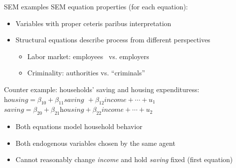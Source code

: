 \documentclass[usenames,dvipsnames]{beamer}
\begin{document}
\begin{frame}{SEM examples}
SEM equation properties (for each equation):\\
\smallskip
\begin{itemize}
\item Variables with proper ceteris paribus interpretation
\item Structural equations describe process from different perspectives\\
\begin{itemize}
    \item Labor market: employees \quad ~vs. \quad employers
    \item Criminality: \quad authorities \quad vs. \quad ``criminals''
\end{itemize}
\end{itemize} \bigskip
\small
Counter example: households' saving and housing expendituress:\\
\medskip
\qquad $\textit{housing} = \beta_{10} + \beta_{11} \textit{saving} ~\,+  \beta_{12} \textit{income} + \cdots + u_1$ \\
\qquad \hspace{0.07cm} $\textit{saving} = \beta_{20} +\beta_{21} \textit{housing} +  \beta_{22} \textit{income} + \cdots + u_2$ \\
\medskip
\begin{itemize}
    \item Both equations model household behavior
    \item Both endogenous variables chosen by the same agent
    \item Cannot reasonably change \textit{income} and hold \textit{saving} fixed (first equation)
\end{itemize}
\end{frame}
\end{document}
